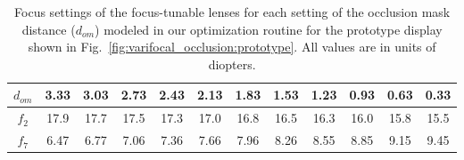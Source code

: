 \begin{table}[t]
\begin{center}
\begin{tabular}{|c|c|c|c|c|c|c|c|c|c|c|c|}
\hline
$d_{om}$ & 3.33  & 3.03  & 2.73  & 2.43  & 2.13  & 1.83  & 1.53  & 1.23  & 0.93  & 0.63  & 0.33  \\ 
\hline
$f_2$          & 17.9 & 17.7 & 17.5 & 17.3 & 17.0 & 16.8 & 16.5 & 16.3 & 16.0 & 15.8 & 15.5 \\ 
\hline
$f_7$          & 6.47  & 6.77  & 7.06  & 7.36  & 7.66  & 7.96  & 8.26  & 8.55  & 8.85  & 9.15  & 9.45  \\ 
\hline
\end{tabular}
\end{center}
\caption[Varifocal-Occlusion NED: focus-tunable lens settings for different virtual image plane distances]{Focus settings of the focus-tunable lenses for each setting of the occlusion mask distance ($d_{om}$) modeled in our optimization routine for the prototype display shown in Fig.~\ref{fig:varifocal_occlusion:prototype}. All values are in units of diopters.}
\label{tab:focus_tunable}
\end{table}
